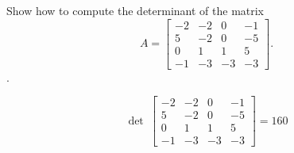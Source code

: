 
\begin{exerciseStatement}


Show how to compute the determinant of the matrix \[A= \left[\begin{array}{cccc}
-2 & -2 & 0 & -1 \\
5 & -2 & 0 & -5 \\
0 & 1 & 1 & 5 \\
-1 & -3 & -3 & -3
\end{array}\right] .\].


\end{exerciseStatement}
    
\begin{exerciseAnswer} 
\[\operatorname{det}\  \left[\begin{array}{cccc}
-2 & -2 & 0 & -1 \\
5 & -2 & 0 & -5 \\
0 & 1 & 1 & 5 \\
-1 & -3 & -3 & -3
\end{array}\right] = 160 \]
\end{exerciseAnswer}
    
